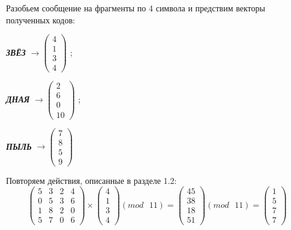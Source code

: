 \documentclass[a5paper, 10pt]{article}
\theoremstyle{definition}
\theoremstyle{plain}
\theoremstyle{remark}
\begin{document}
Разобьем сообщение на фрагменты по 4 символа и предствим векторы полученных кодов:
\begin{center}
\textbf{\textit{ЗВЁЗ}} $\to \begin{pmatrix}
 4\\
1\\
3\\
4
\end{pmatrix}$ ;

\textbf{\textit{ДНАЯ}}  $\to \begin{pmatrix}
 2\\
6\\
0\\
10
\end{pmatrix}$ ;

\textbf{\textit{ПЫЛЬ}}  $\to \begin{pmatrix}
7\\
8\\
 5\\
9
\end{pmatrix}$ \\
\end{center}
Повторяем действия, описанные в разделе 1.2:
\begin{equation}
\begin{pmatrix}
 5 & 3 & 2 & 4 \\
 0 & 5 & 3 & 6 \\
1& 8 & 2 & 0\\
 5 & 7 & 0 & 6
\end{pmatrix}
 \times
\begin{pmatrix}
 4\\
1\\
3\\
4
\end{pmatrix}
(mod \text{ }11)
= 
\begin{pmatrix}
45\\
38\\
18\\
51
\end{pmatrix}
(mod \text{ }11)
= \begin{pmatrix}
1\\
5\\
7\\
7
\end{pmatrix}
\end{equation}
\end{document}
